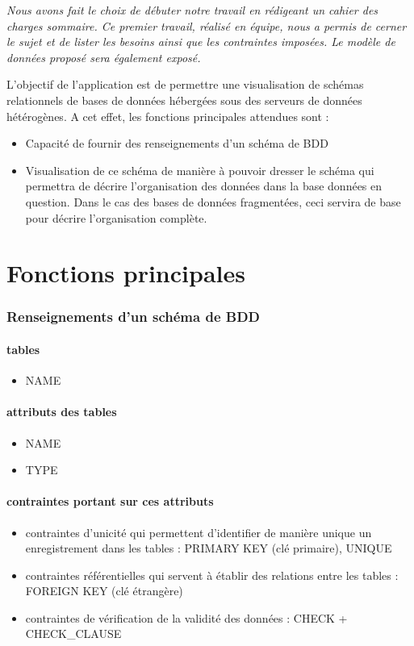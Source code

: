 \textit{Nous avons fait le choix de débuter notre travail en rédigeant un cahier des charges sommaire. Ce premier travail, réalisé en équipe, nous a permis de cerner le sujet et de lister les besoins ainsi que les contraintes imposées. Le modèle de données proposé sera également exposé.}


L’objectif de l'application est de permettre une visualisation de schémas relationnels de bases de données hébergées sous des serveurs de données hétérogènes.
A cet effet, les fonctions principales attendues sont : 
\begin{itemize}
  \item Capacité de fournir des renseignements d'un schéma de BDD
  \item Visualisation de ce schéma de manière à pouvoir dresser le schéma
  qui permettra de décrire l'organisation des données dans la base données en question. Dans le cas des bases de données fragmentées, ceci servira de base pour décrire l'organisation complète.
\end{itemize}


\section{Fonctions principales}
		\subsubsection{Renseignements d'un schéma de BDD}
			\paragraph{tables}
				\begin{itemize}
					\item NAME
				\end{itemize}
			\paragraph{attributs des tables}
				\begin{itemize}
					\item NAME
					\item TYPE
				\end{itemize}
			\paragraph{contraintes portant sur ces attributs}
				\begin{itemize}
					\item contraintes d'unicité qui permettent d'identifier de manière unique un enregistrement dans les tables : PRIMARY KEY (clé primaire), UNIQUE  
					\item contraintes référentielles qui servent à établir des relations entre les tables : FOREIGN KEY (clé étrangère)
					\item contraintes de vérification de la validité des données : CHECK + CHECK\_CLAUSE
				\end{itemize} 
